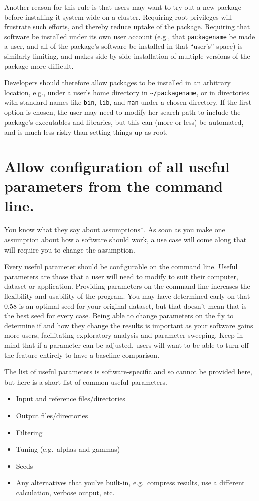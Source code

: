 \documentclass[10pt]{article}
\begin{document}
Another reason for this rule is that users may want to try out a new
package before installing it system-wide on a cluster. Requiring root
privileges will frustrate such efforts, and thereby reduce uptake of the
package. Requiring that software be installed under its own user account
(e.g., that \texttt{packagename} be made a user, and all of the
package's software be installed in that ``user's'' space) is similarly
limiting, and makes side-by-side installation of multiple versions of
the package more difficult.

Developers should therefore allow packages to be installed in an
arbitrary location, e.g., under a user's home directory in
\texttt{\textasciitilde{}/packagename}, or in directories with standard
names like \texttt{bin}, \texttt{lib}, and \texttt{man} under a chosen
directory. If the first option is chosen, the user may need to modify
her search path to include the package's executables and libraries, but
this can (more or less) be automated, and is much less risky than
setting things up as root.

\section{Allow configuration of all useful parameters from the command line.}

You know what they say about assumptions*. As soon as you make one
assumption about how a software should work, a use case will come along
that will require you to change the assumption.

Every useful parameter should be configurable on the command line.
Useful parameters are those that a user will need to modify to suit
their computer, dataset or application. Providing parameters on the
command line increases the flexibility and usability of the program. You
may have determined early on that 0.58 is an optimal seed for your
original dataset, but that doesn't mean that is the best seed for every
case. Being able to change parameters on the fly to determine if and how
they change the results is important as your software gains more users,
facilitating exploratory analysis and parameter sweeping. Keep in mind
that if a parameter can be adjusted, users will want to be able to turn
off the feature entirely to have a baseline comparison.

The list of useful parameters is software-specific and so cannot be
provided here, but here is a short list of common useful parameters.

\begin{itemize}
\item
  Input and reference files/directories
\item
  Output files/directories
\item
  Filtering
\item
  Tuning (e.g.~alphas and gammas)
\item
  Seeds
\item
  Any alternatives that you've built-in, e.g.~compress results, use a
  different calculation, verbose output, etc.
\end{itemize}
\end{document}
